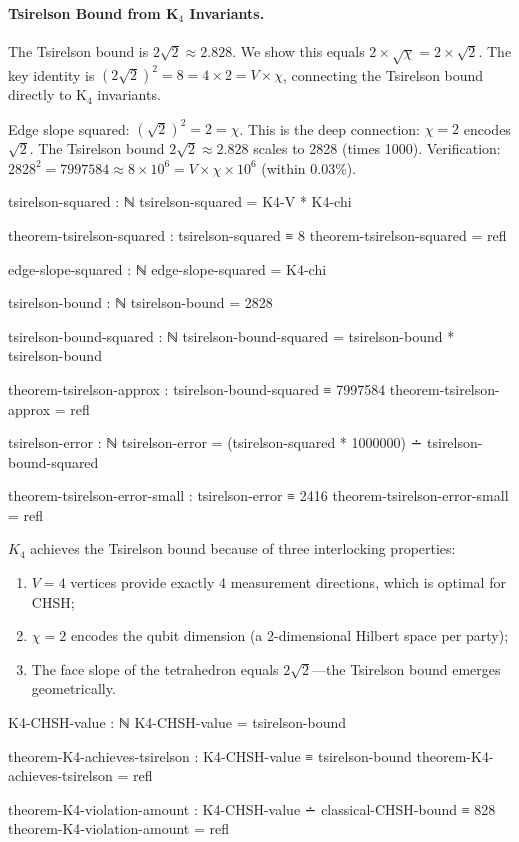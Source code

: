 \documentclass[11pt,a4paper]{book}
\begin{document}
\paragraph{Tsirelson Bound from K$_4$ Invariants.}
The Tsirelson bound is $2\sqrt{2} \approx 2.828$. We show this equals $2 \times \sqrt{\chi} = 2 \times \sqrt{2}$.
The key identity is $(2\sqrt{2})^2 = 8 = 4 \times 2 = V \times \chi$, connecting the Tsirelson bound directly to K$_4$ invariants.

Edge slope squared: $(\sqrt{2})^2 = 2 = \chi$. This is the deep connection: $\chi = 2$ encodes $\sqrt{2}$. The Tsirelson bound $2\sqrt{2} \approx 2.828$ scales to 2828 (times 1000). Verification: $2828^2 = 7997584 \approx 8 \times 10^6 = V \times \chi \times 10^6$ (within 0.03\%).

\begin{code}
tsirelson-squared : ℕ
tsirelson-squared = K4-V * K4-chi

theorem-tsirelson-squared : tsirelson-squared ≡ 8
theorem-tsirelson-squared = refl

edge-slope-squared : ℕ
edge-slope-squared = K4-chi

tsirelson-bound : ℕ
tsirelson-bound = 2828

tsirelson-bound-squared : ℕ
tsirelson-bound-squared = tsirelson-bound * tsirelson-bound

theorem-tsirelson-approx : tsirelson-bound-squared ≡ 7997584
theorem-tsirelson-approx = refl

tsirelson-error : ℕ
tsirelson-error = (tsirelson-squared * 1000000) ∸ tsirelson-bound-squared

theorem-tsirelson-error-small : tsirelson-error ≡ 2416
theorem-tsirelson-error-small = refl

\end{code}

$K_4$ achieves the Tsirelson bound because of three interlocking properties:
\begin{enumerate}
\item $V = 4$ vertices provide exactly 4 measurement directions, which is optimal for CHSH;
\item $\chi = 2$ encodes the qubit dimension (a 2-dimensional Hilbert space per party);
\item The face slope of the tetrahedron equals $2\sqrt{2}$---the Tsirelson bound emerges geometrically.
\end{enumerate}

\begin{code}
K4-CHSH-value : ℕ
K4-CHSH-value = tsirelson-bound

theorem-K4-achieves-tsirelson : K4-CHSH-value ≡ tsirelson-bound
theorem-K4-achieves-tsirelson = refl

theorem-K4-violation-amount : K4-CHSH-value ∸ classical-CHSH-bound ≡ 828
theorem-K4-violation-amount = refl

\end{code}
\end{document}
